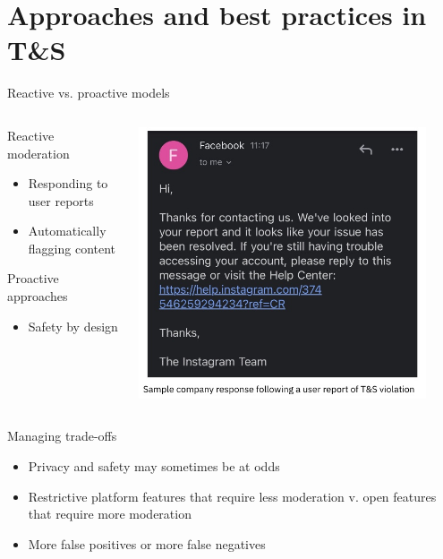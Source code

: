 \documentclass[nobackground,dvipsnames,table]{beamer}
\begin{document}
\section{Approaches and best practices in T\&S}



\begin{frame}{Reactive vs. proactive models}
	\begin{columns}
		\begin{column}{0.5\textwidth}  %
			Reactive moderation
			\begin{itemize}
				\item Responding to user reports
				\item Automatically flagging content
			\end{itemize}
			Proactive approaches
			\begin{itemize}
				\item Safety by design
			\end{itemize}
		\end{column}
		\begin{column}{0.5\textwidth}
			\begin{center}
				\includegraphics[width=0.9\textwidth]{img/response.jpg}
			\end{center}
		\end{column}
	\end{columns}
\end{frame}

\begin{frame}{Managing trade-offs}
	\begin{itemize}
		\item Privacy and safety may sometimes be at odds
		\item Restrictive platform features that require less moderation v. open features that require more moderation
		\item More false positives or more false negatives
	\end{itemize}
\end{frame}
\end{document}
